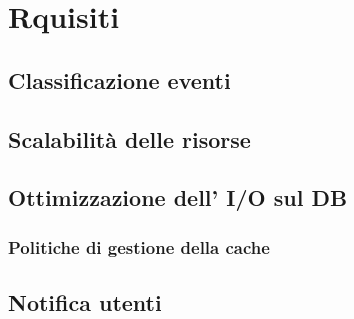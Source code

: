 \chapter{Rquisiti}


\section{Classificazione eventi}


\section{Scalabilità delle risorse}

\section{Ottimizzazione dell' I/O sul DB}

\subsection{Politiche di gestione della cache}

\section{Notifica utenti} 